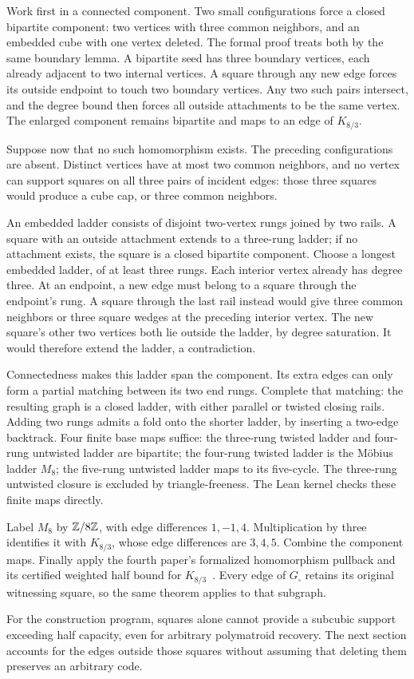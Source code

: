 \begin{outline}
Work first in a connected component. Two small configurations force a
closed bipartite component: two vertices with three common neighbors,
and an embedded cube with one vertex deleted. The formal proof treats
both by the same boundary lemma. A bipartite seed has three boundary
vertices, each already adjacent to two internal vertices. A square
through any new edge forces its outside endpoint to touch two boundary
vertices. Any two such pairs intersect, and the degree bound then forces
all outside attachments to be the same vertex. The enlarged component
remains bipartite and maps to an edge of $K_{8/3}$.

Suppose now that no such homomorphism exists. The preceding configurations
are absent. Distinct vertices have at most two common neighbors, and no
vertex can support squares on all three pairs of incident edges: those
three squares would produce a cube cap, or three common neighbors.

An embedded ladder consists of disjoint two-vertex rungs joined by two
rails. A square with an outside attachment extends to a three-rung
ladder; if no attachment exists, the square is a closed bipartite
component. Choose a longest embedded ladder, of at least three rungs.
Each interior vertex already has degree three. At an endpoint, a new
edge must belong to a square through the endpoint's rung. A square
through the last rail instead would give three common neighbors or
three square wedges at the preceding interior vertex. The new square's
other two vertices both lie outside the ladder, by degree saturation.
It would therefore extend the ladder, a contradiction.

Connectedness makes this ladder span the component. Its extra edges
can only form a partial matching between its two end rungs. Complete
that matching: the resulting graph is a closed ladder, with either
parallel or twisted closing rails. Adding two rungs admits a fold onto
the shorter ladder, by inserting a two-edge backtrack. Four finite base
maps suffice: the three-rung twisted ladder and four-rung untwisted
ladder are bipartite; the four-rung twisted ladder is the M\"obius
ladder $M_8$; the five-rung untwisted ladder maps to its five-cycle.
The three-rung untwisted closure is excluded by triangle-freeness.
The Lean kernel checks these finite maps directly.

Label $M_8$ by $\mathbb{Z}/8\mathbb{Z}$, with edge differences $1,-1,4$.
Multiplication by three identifies it with $K_{8/3}$, whose edge
differences are $3,4,5$. Combine the component maps. Finally apply
the fourth paper's formalized homomorphism pullback and its certified
weighted half bound for $K_{8/3}$~\cite{BrendeCurved}. Every edge of
$G_\square$ retains its original witnessing square, so the same theorem
applies to that subgraph.
\end{outline}

For the construction program, squares alone cannot provide a subcubic
support exceeding half capacity, even for arbitrary polymatroid recovery.
The next section accounts for the edges outside those squares without
assuming that deleting them preserves an arbitrary code.
